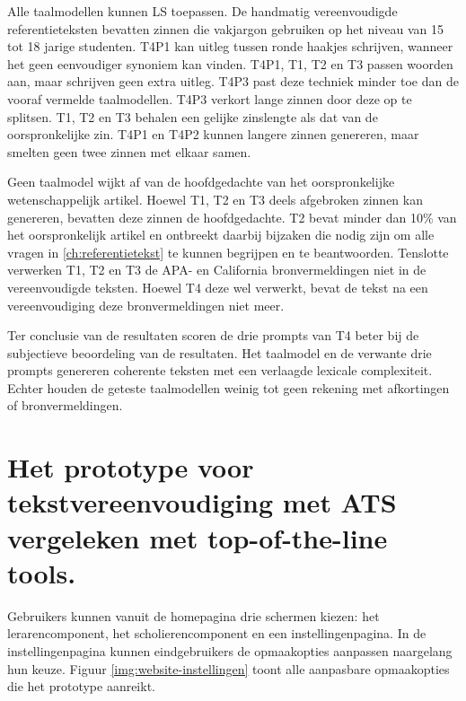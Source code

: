 \medspace

Alle taalmodellen kunnen LS toepassen. De handmatig vereenvoudigde referentieteksten bevatten zinnen die vakjargon gebruiken op het niveau van 15 tot 18 jarige studenten. T4P1 kan uitleg tussen ronde haakjes schrijven, wanneer het geen eenvoudiger synoniem kan vinden. T4P1, T1, T2 en T3 passen woorden aan, maar schrijven geen extra uitleg. T4P3 past deze techniek minder toe dan de vooraf vermelde taalmodellen. T4P3 verkort lange zinnen door deze op te splitsen. T1, T2 en T3 behalen een gelijke zinslengte als dat van de oorspronkelijke zin. T4P1 en T4P2 kunnen langere zinnen genereren, maar smelten geen twee zinnen met elkaar samen. 

\medspace

Geen taalmodel wijkt af van de hoofdgedachte van het oorspronkelijke wetenschappelijk artikel. Hoewel T1, T2 en T3 deels afgebroken zinnen kan genereren, bevatten deze zinnen de hoofdgedachte. T2 bevat minder dan 10\% van het oorspronkelijk artikel en ontbreekt daarbij bijzaken die nodig zijn om alle vragen in \ref{ch:referentietekst} te kunnen begrijpen en te beantwoorden. Tenslotte verwerken T1, T2 en T3 de APA- en California bronvermeldingen niet in de vereenvoudigde teksten. Hoewel T4 deze wel verwerkt, bevat de tekst na een vereenvoudiging deze bronvermeldingen niet meer.

\medspace

Ter conclusie van de resultaten scoren de drie prompts van T4 beter bij de subjectieve beoordeling van de resultaten. Het taalmodel en de verwante drie prompts genereren coherente teksten met een verlaagde lexicale complexiteit. Echter houden de geteste taalmodellen weinig tot geen rekening met afkortingen of bronvermeldingen.

\section{Het prototype voor tekstvereenvoudiging met ATS vergeleken met top-of-the-line tools.}


Gebruikers kunnen vanuit de homepagina drie schermen kiezen: het lerarencomponent, het scholierencomponent en een instellingenpagina. In de instellingenpagina kunnen eindgebruikers de opmaakopties aanpassen naargelang hun keuze. Figuur \ref{img:website-instellingen} toont alle aanpasbare opmaakopties die het prototype aanreikt.

